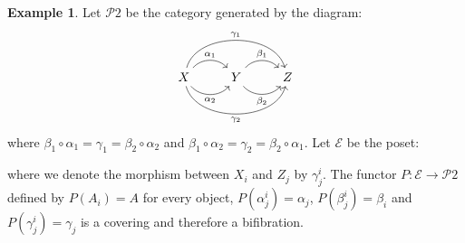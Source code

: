 \documentclass[12pt,reqno]{amsart}
\theoremstyle{definition}
\newtheorem{example}[teo]{Example}
\theoremstyle{remark}
\numberwithin{figure}{section}%
\newcommand{\E}{\mathcal{E}}
\begin{document}
\begin{example}\label{ProjectivePlane}
    Let $\mathcal{P}2$ be the category generated by the diagram:
    $$
\begin{tikzcd}
X \arrow[r, "\alpha_1", bend left=49] \arrow[r, "\alpha_2"', bend right=49] \arrow[rr, "\gamma_1", bend left=75] \arrow[rr, "\gamma_2"', bend right=75] & Y \arrow[r, "\beta_2"', bend right=49] \arrow[r, "\beta_1", bend left=49] & Z
\end{tikzcd}
    $$
    where $\beta_1 \circ \alpha_1= \gamma_1=\beta_2 \circ \alpha_2$ and $\beta_1 \circ \alpha_2=\gamma_2=\beta_2 \circ \alpha_1$. Let $\E$ be the poset:
     

    where we denote the morphism between $X_i$ and $Z_j$ by $\gamma_j^i$.
    The functor $P \colon \E \rightarrow \mathcal{P}2$ defined by $P(A_i)=A$ for every object, $P(\alpha_j^i)=\alpha_j$, $P(\beta_j^i)=\beta_i$ and $P(\gamma_j^i)=\gamma_j$ is a covering and therefore a bifibration.


\end{example}
\end{document}
